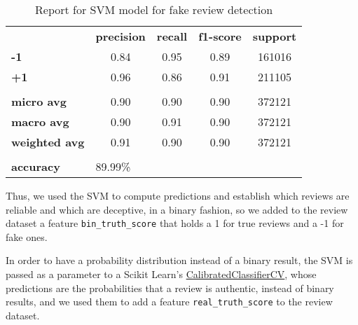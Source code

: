\begin{table}[h!]
	\centering
	\begin{tabular}{lcccc}
		\rowcolor[HTML]{EEEEEE} 
		\cellcolor[HTML]{FBFBFB} & \textbf{precision} & \textbf{recall} & \textbf{f1-score} & \textbf{support} \\
		\rowcolor[HTML]{EEEEEE} 
		\textbf{-1}              & 0.84               & 0.95            & 0.89              & 161016           \\
		\rowcolor[HTML]{EEEEEE} 
		\textbf{+1}              & 0.96               & 0.86            & 0.91              & 211105           \\
		\rowcolor[HTML]{FBFBFB} 
		&                    &                 &                   &                  \\
		\rowcolor[HTML]{EEEEEE} 
		\textbf{micro avg}       & 0.90               & 0.90            & 0.90              & 372121           \\
		\rowcolor[HTML]{EEEEEE} 
		\textbf{macro avg}       & 0.90               & 0.91            & 0.90              & 372121           \\
		\rowcolor[HTML]{EEEEEE} 
		\textbf{weighted avg}    & 0.91               & 0.90            & 0.90              & 372121           \\
		\rowcolor[HTML]{FBFBFB} 
		&                    &                 &                   &                  \\
		\rowcolor[HTML]{EEEEEE} 
		\textbf{accuracy}        & \multicolumn{4}{l}{\cellcolor[HTML]{EEEEEE}89.99\%}                        
	\end{tabular}
	
	\caption{Report for SVM model for fake review detection}
	\label{tab:svm-fake-rev}
\end{table}

Thus, we used the SVM to compute predictions and establish which reviews are reliable and which are deceptive, in a binary fashion, so we added to the review dataset a feature \texttt{bin\_truth\_score} that holds a 1 for true reviews and a -1 for fake ones.

In order to have a probability distribution instead of a binary result, the SVM is passed as a parameter to a Scikit Learn's \href{https://scikit-learn.org/stable/modules/generated/sklearn.calibration.CalibratedClassifierCV.html}{CalibratedClassifierCV}, whose predictions are the probabilities that a review is authentic, instead of binary results, and we used them to add a feature \texttt{real\_truth\_score} to the review dataset.

